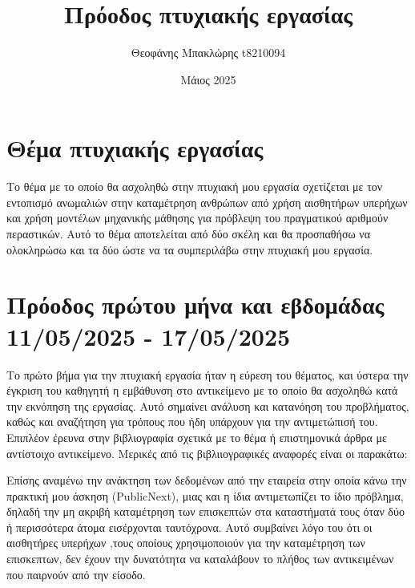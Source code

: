\documentclass{article}
\title{Πρόοδος πτυχιακής εργασίας}
\author{Θεοφάνης Μπακλώρης t8210094}
\date{Μάιος 2025}
\begin{document}

\maketitle

\section{Θέμα πτυχιακής εργασίας}

Το θέμα με το οποίο θα ασχοληθώ στην πτυχιακή μου εργασία σχετίζεται με τον εντοπισμό ανωμαλιών στην καταμέτρηση ανθρώπων από χρήση αισθητήρων υπερήχων και χρήση μοντέλων μηχανικής μάθησης για πρόβλεψη του πραγματικού αριθμούν περαστικών.
Αυτό το θέμα αποτελείται από δύο σκέλη και θα προσπαθήσω να ολοκληρώσω και τα δύο ώστε να τα συμπεριλάβω στην πτυχιακή μου εργασία.

\section{Πρόοδος πρώτου μήνα και εβδομάδας 11/05/2025 - 17/05/2025}

Το πρώτο βήμα για την πτυχιακή εργασία ήταν η εύρεση του θέματος, και ύστερα την έγκριση του καθηγητή η εμβάθυνση στο αντικείμενο με το οποίο θα ασχοληθώ κατά την εκνόπηση της εργασίας. Αυτό σημαίνει ανάλυση και κατανόηση του προβλήματος, καθώς και αναζήτηση για τρόπους που ήδη υπάρχουν για την αντιμετώπισή του. Επιπλέον έρευνα στην βιβλιογραφία σχετικά με το θέμα ή επιστημονικά άρθρα με αντίστοιχο αντικείμενο. Μερικές από τις βιβλιιογραφικές αναφορές είναι οι παρακάτω:
\cite{xie2023ir}
\cite{cokbas2020}
\cite{ir-uwm}
\cite{robust}

Επίσης αναμένω την ανάκτηση των δεδομένων από την εταιρεία στην οποία κάνω την πρακτική μου άσκηση (PublicNext), μιας και η ίδια αντιμετωπίζει το ίδιο πρόβλημα, δηλαδή την μη ακριβή καταμέτρηση των επισκεπτών στα καταστήματά τους όταν δύο ή περισσότερα άτομα εισέρχονται ταυτόχρονα. Αυτό συμβαίνει λόγο του ότι οι αισθητήρες υπερήχων ,τους οποίους χρησιμοποιούν για την καταμέτρηση των επισκεπτων, δεν έχουν την δυνατότητα να καταλάβουν το πλήθος των αντικειμένων που παιρνούν από την είσοδο. 



\end{document}
